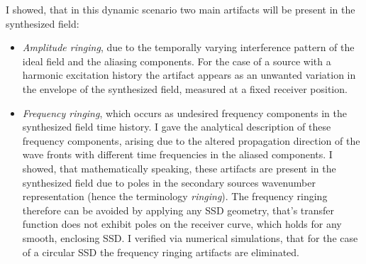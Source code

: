 \documentclass[a4paper,10pt]{article}
\begin{document}
\begin{itemize}
\begin{itemize}
I showed, that in this dynamic scenario two main artifacts will be present in the synthesized field:
	\begin{itemize}
	\item \emph{Amplitude ringing}, due to the temporally varying interference pattern of the ideal field and the aliasing components.
	For the case of a source with a harmonic excitation history the artifact appears as an unwanted variation in the envelope of the synthesized field, measured at a fixed receiver position.
	\item \emph{Frequency ringing}, which occurs as undesired frequency components in the synthesized field time history.
	I gave the analytical description of these frequency components, arising due to the altered propagation direction of the wave fronts with different time frequencies in the aliased components.
	I showed, that mathematically speaking, these artifacts are present in the synthesized field due to poles in the secondary sources wavenumber representation (hence the terminology \emph{ringing}).
	The frequency ringing therefore can be avoided by applying any SSD geometry, that's transfer function does not exhibit poles on the receiver curve, which holds for any smooth, enclosing SSD.
	I verified via numerical simulations, that for the case of a circular SSD the frequency ringing artifacts are eliminated. 
	\end{itemize}
	\end{itemize}
\end{itemize}
\end{document}
